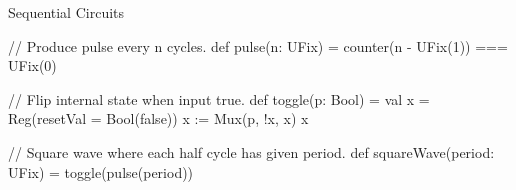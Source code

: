 \documentclass[xcolor=pdflatex,dvipsnames,table]{beamer}
\begin{document}
\begin{frame}[fragile]{Sequential Circuits}

\begin{scala}
// Produce pulse every n cycles.
def pulse(n: UFix) = counter(n - UFix(1)) === UFix(0)
\end{scala}

\begin{scala}
// Flip internal state when input true.
def toggle(p: Bool) = {
  val x = Reg(resetVal = Bool(false))
  x := Mux(p, !x, x)
  x
}
\end{scala}

\begin{scala}
// Square wave where each half cycle has given period.
def squareWave(period: UFix) = toggle(pulse(period))
\end{scala}

\end{frame}
\end{document}
